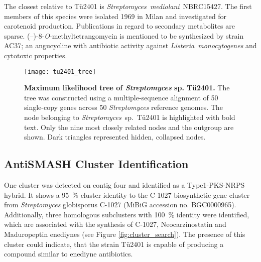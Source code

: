 The closest relative to Tü2401 is \emph{Streptomyces~mediolani}~NBRC15427.
The first members of this species were isolated 1969 in Milan and investigated for carotenoid production.\autocite{Arcamone1969,Bianchi1970}
Publications in regard to secondary metabolites are sparse.
(--)-8-\emph{O}-methyltetrangomycin is mentioned to be synthesized by strain AC37; an angucycline with antibiotic activity against \emph{Listeria~monocytogenes} and cytotoxic properties.\autocite{Maruna2010,Jimenez2012}

\begin{figure}[htbp]
	\texttt{[image: tu2401\_tree]}
	\caption[Maximum likelihood tree of \emph{Streptomyces} sp. Tü2401.]{%
		\textbf{Maximum likelihood tree of \emph{Streptomyces} sp. Tü2401.}
		The tree was constructed using a multiple-sequence alignment of 50 single-copy genes across 50 \textit{Streptomyces} reference genomes.
		The node belonging to \textit{Streptomyces}~sp.~Tü2401 is highlighted with bold text.
		Only the nine most closely related nodes and the outgroup are shown.
		Dark triangles represented hidden, collapsed nodes.}
	\label{fig:phylo_tree}
\end{figure}


\subsection{AntiSMASH Cluster Identification} %
\label{sub:antismash_cluster_identification}


 One cluster was detected on contig four and identified as a Type1-PKS-NRPS hybrid.
 It shows a 95~\% cluster identity to the C-1027 biosynthetic gene cluster from \textit{Streptomyces} globisporus C-1027 (MiBiG accession no. BGC0000965). Additionally, three homologous subclusters with 100~\% identity were identified, which are associated with the synthesis of C-1027, Neocarzinostatin and Maduropeptin enediynes (see Figure \ref{fig:cluster_search}).
 The presence of this cluster could indicate, that the strain Tü2401 is capable of producing a compound similar to enediyne antibiotics.

